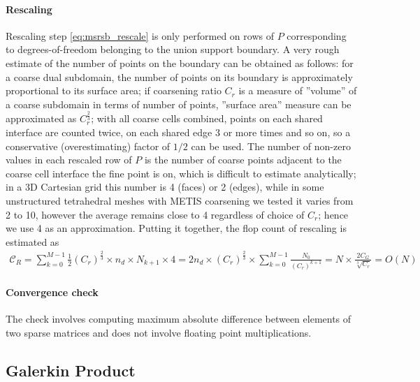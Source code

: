 \paragraph{Rescaling}
Rescaling step \cref{eq:msrsb_rescale} is only performed on rows of $P$ corresponding to degrees-of-freedom belonging to the union support boundary.   A very rough estimate of the number of points on the boundary can be obtained as follows: for a coarse dual subdomain, the number of points on its boundary is approximately proportional to its surface area; if coarsening ratio $C_r$ is a measure of ''volume'' of a coarse subdomain in terms of number of points, ''surface area'' measure can be approximated as $C_r^{\frac{2}{3}}$; with all coarse cells combined, points on each shared interface are counted twice, on each shared edge 3 or more times and so on, so a conservative (overestimating) factor of $1/2$ can be used.   The number of non-zero values in each rescaled row of $P$ is the number of coarse points adjacent to the coarse cell interface the fine point is on, which is difficult to estimate analytically; in a 3D Cartesian grid this number is 4 (faces) or 2 (edges), while in some unstructured tetrahedral meshes with METIS coarsening we tested it varies from 2 to 10, however the average remains close to 4 regardless of choice of $C_r$; hence we use 4 as an approximation.   Putting it together, the flop count of rescaling is estimated as
\begin{align}
    \mathcal{C}_{R} = \sum\limits_{k=0}^{M-1}\frac{1}{2}(C_r)^{\frac{2}{3}} \times n_d \times N_{k+1} \times 4 = 2 n_d \times (C_r)^{\frac{2}{3}} \times \sum\limits_{k=0}^{M-1}\frac{N_0}{(C_r)^{k+1}} = N \times \frac{2C_G}{\sqrt[3]{C_r}} = O(N) \label{eq:complexity_rescale}
\end{align}

\paragraph{Convergence check}
The check involves computing maximum absolute difference between elements of two sparse matrices and does not involve floating point multiplications.

\subsection{Galerkin Product}

